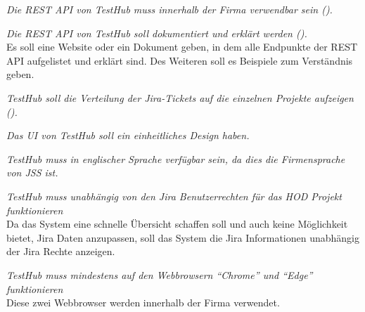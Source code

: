 \begin{description}
    \textit{Die REST API von TestHub muss innerhalb der Firma verwendbar sein ().}

    \textit{Die REST API von TestHub soll dokumentiert und erklärt werden ().}\\
    Es soll eine Website oder ein Dokument geben, in dem alle Endpunkte der REST API
    aufgelistet und erklärt sind. Des Weiteren soll es Beispiele zum 
    Verständnis geben.

    \textit{TestHub soll die Verteilung der Jira-Tickets auf die einzelnen Projekte 
    aufzeigen ().}

    \textit{Das \gls{UI} von TestHub soll ein einheitliches Design haben.}

    \textit{TestHub muss in englischer Sprache verfügbar sein, da dies die 
    Firmensprache von JSS ist.}

    \textit{TestHub muss unabhängig von den Jira Benutzerrechten für das HOD Projekt funktionieren}\\
    Da das System eine schnelle Übersicht schaffen soll und auch keine Möglichkeit
    bietet, Jira Daten anzupassen, soll das System die Jira Informationen unabhängig der Jira Rechte anzeigen.

    \textit{TestHub muss mindestens auf den Webbrowsern ``Chrome'' und ``Edge'' funktionieren}\\
    Diese zwei Webbrowser werden innerhalb der Firma verwendet.

    
\end{description}